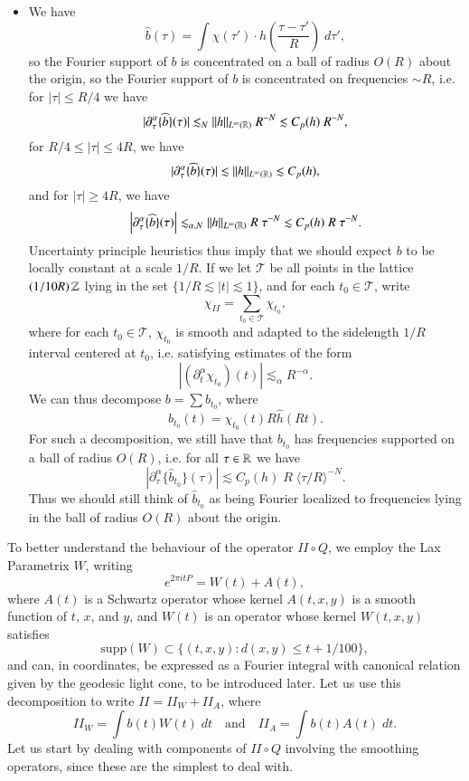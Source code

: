 \begin{itemize}
    \item We have
    \[ \widehat{b}(\tau) = \int \widehat{\chi}(\tau') \cdot h \left( \frac{\tau - \tau'}{R} \right)\; d\tau', \]
    so the Fourier support of $b$ is concentrated on a ball of radius $O(R)$ about the origin, so the Fourier support of $b$ is concentrated on frequencies $\sim R$, i.e. for $|\tau| \leq R/4$ we have
    \[ |\partial_\tau^\alpha \{ \widehat{b} \}(\tau)| \lesssim_N \| h \|_{L^\infty(\operatorname{\mathbb{R}})}\; R^{-N} \lesssim C_p(h) \; R^{-N}, \]
    for $R/4 \leq |\tau| \leq 4R$, we have
    \[ |\partial_\tau^\alpha \{ \widehat{b} \}(\tau)| \lesssim \| h \|_{L^\infty(\operatorname{\mathbb{R}})} \lesssim C_p(h), \]
    and for $|\tau| \geq 4R$, we have
    \[ \Big| \partial_\tau^\alpha \{ \widehat{b} \} (\tau) \Big| \lesssim_{\alpha,N} \| h \|_{L^\infty(\operatorname{\mathbb{R}})}\; R\; \tau^{-N} \lesssim C_p(h)\; R\; \tau^{-N}. \]
    Uncertainty principle heuristics thus imply that we should expect $b$ to be locally constant at a scale $1/R$. If we let $\mathcal{T}$ be all points in the lattice $(1/10R) \operatorname{\mathbb{Z}}$ lying in the set $\{ 1/R \lesssim |t| \lesssim 1 \}$, and for each $t_0 \in \mathcal{T}$, write
    \[ \chi_{II} = \sum_{t_0 \in \mathcal{T}} \chi_{t_0}, \]
    where for each $t_0 \in \mathcal{T}$, $\chi_{t_0}$ is smooth and adapted to the sidelength $1/R$ interval centered at $t_0$, i.e. satisfying estimates of the form
    \[ | (\partial_t^\alpha \chi_{t_0})(t) | \lesssim_\alpha R^{- \alpha}. \]
    We can thus decompose $b = \sum b_{t_0}$, where
    \[ b_{t_0}(t) = \chi_{t_0}(t) R \widehat{h}(Rt). \]
    For such a decomposition, we still have that $b_{t_0}$ has frequencies supported on a ball of radius $O(R)$, i.e. for all $\tau \in \operatorname{\mathbb{R}}$ we have
    \[ | \partial_\tau^\alpha \{ \widehat{b}_{t_0} \}(\tau) | \lesssim C_p(h)\; R\; \langle \tau / R \rangle^{-N}. \]
    Thus we should still think of $\widehat{b}_{t_0}$ as being Fourier localized to frequencies lying in the ball of radius $O(R)$ about the origin.
\end{itemize}

To better understand the behaviour of the operator $II \circ Q$, we employ the Lax Parametrix $W$, writing
%
\[ e^{2 \pi i t P} = W(t) + A(t), \]
%
where $A(t)$ is a Schwartz operator whose kernel $A(t,x,y)$ is a smooth function of $t$, $x$, and $y$, and $W(t)$ is an operator whose kernel $W(t,x,y)$ satisfies
%
\[ \text{supp}(W) \subset \{ (t,x,y) : d(x,y) \leq t + 1 / 100 \}, \]
%
and can, in coordinates, be expressed as a Fourier integral with canonical relation given by the geodesic light cone, to be introduced later. Let us use this decomposition to write $II = II_W + II_A$, where
%
\[ II_W = \int b(t) W(t)\; dt \quad\text{and}\quad II_A = \int b(t) A(t)\; dt. \]
%
%
%
Let us start by dealing with components of $II \circ Q$ involving the smoothing operators, since these are the simplest to deal with.

